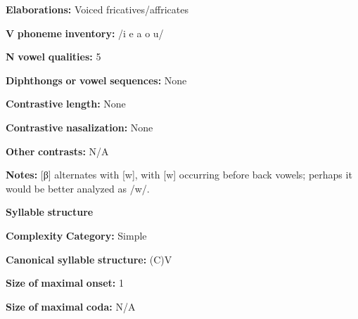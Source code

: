 \begin{styleBody}
\textbf{Elaborations:} Voiced fricatives/affricates
\end{styleBody}

\begin{styleBody}
\textbf{V} \textbf{phoneme} \textbf{inventory:} /i e a o u/
\end{styleBody}

\begin{styleBody}
\textbf{N} \textbf{vowel} \textbf{qualities:} 5
\end{styleBody}

\begin{styleBody}
\textbf{Diphthongs} \textbf{or} \textbf{vowel} \textbf{sequences:} None
\end{styleBody}

\begin{styleBody}
\textbf{Contrastive} \textbf{length:} None
\end{styleBody}

\begin{styleBody}
\textbf{Contrastive} \textbf{nasalization:} None
\end{styleBody}

\begin{styleBody}
\textbf{Other} \textbf{contrasts:} N/A
\end{styleBody}

\begin{styleBody}
\textbf{Notes:} [β] alternates with [w], with [w] occurring before back vowels; perhaps it would be better analyzed as /w/.
\end{styleBody}

\begin{styleBody}
\textbf{Syllable} \textbf{structure}
\end{styleBody}

\begin{styleBody}
\textbf{Complexity} \textbf{Category:} Simple
\end{styleBody}

\begin{styleBody}
\textbf{Canonical} \textbf{syllable} \textbf{structure:} (C)V \citep[7]{Dutton1996}
\end{styleBody}

\begin{styleBody}
\textbf{Size} \textbf{of} \textbf{maximal} \textbf{onset:} 1
\end{styleBody}

\begin{styleBody}
\textbf{Size} \textbf{of} \textbf{maximal} \textbf{coda:} N/A
\end{styleBody}

